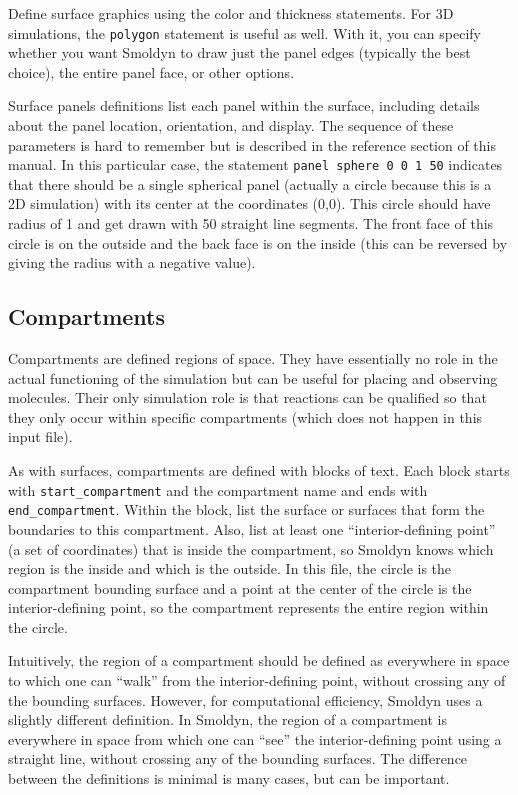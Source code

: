 \documentclass {scrbook}
\newcommand {\ttt} {\texttt}
\begin{document}
Define surface graphics using the color and thickness statements. For 3D simulations, the  \ttt{polygon} statement is useful as well. With it, you can specify whether you want Smoldyn to draw just the panel edges (typically the best choice), the entire panel face, or other options.

Surface panels definitions list each panel within the surface, including details about the panel location, orientation, and display. The sequence of these parameters is hard to remember but is described in the reference section of this manual. In this particular case, the statement  \ttt{panel sphere 0 0 1 50} indicates that there should be a single spherical panel (actually a circle because this is a 2D simulation) with its center at the coordinates (0,0). This circle should have radius of 1 and get drawn with 50 straight line segments. The front face of this circle is on the outside and the back face is on the inside (this can be reversed by giving the radius with a negative value).

\subsection*{Compartments}

Compartments are defined regions of space. They have essentially no role in the actual functioning of the simulation but can be useful for placing and observing molecules. Their only simulation role is that reactions can be qualified so that they only occur within specific compartments (which does not happen in this input file).

As with surfaces, compartments are defined with blocks of text. Each block starts with  \ttt{start\_compartment} and the compartment name and ends with  \ttt{end\_compartment}. Within the block, list the surface or surfaces that form the boundaries to this compartment. Also, list at least one ``interior-defining point'' (a set of coordinates) that is inside the compartment, so Smoldyn knows which region is the inside and which is the outside. In this file, the circle is the compartment bounding surface and a point at the center of the circle is the interior-defining point, so the compartment represents the entire region within the circle.

Intuitively, the region of a compartment should be defined as everywhere in space to which one can ``walk'' from the interior-defining point, without crossing any of the bounding surfaces. However, for computational efficiency, Smoldyn uses a slightly different definition. In Smoldyn, the region of a compartment is everywhere in space from which one can ``see'' the interior-defining point using a straight line, without crossing any of the bounding surfaces. The difference between the definitions is minimal is many cases, but can be important.
\end{document}
